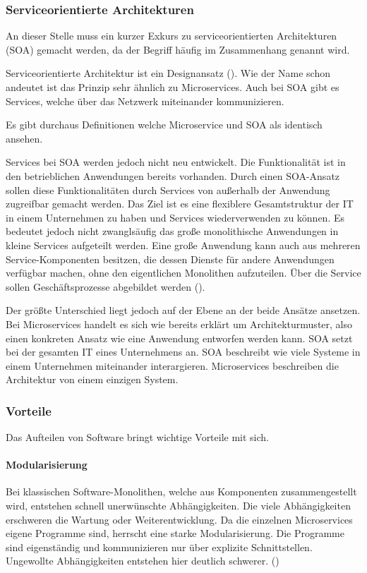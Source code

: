 \subsubsection{Serviceorientierte Architekturen}

An dieser Stelle muss ein kurzer Exkurs zu serviceorientierten Architekturen (SOA) gemacht werden, da der Begriff häufig im Zusammenhang genannt wird. 

Serviceorientierte Architektur ist ein Designansatz (\cite[S. 29]{newmanMicroservices2015}). Wie der Name schon andeutet ist das Prinzip sehr ähnlich zu Microservices. Auch bei SOA gibt es Services, welche über das Netzwerk miteinander kommunizieren.
  
Es gibt durchaus Definitionen welche Microservice und SOA als identisch ansehen. 

Services bei SOA werden jedoch nicht neu entwickelt. Die Funktionalität ist in den betrieblichen Anwendungen bereits vorhanden. Durch einen SOA-Ansatz sollen diese Funktionalitäten durch Services von außerhalb der Anwendung zugreifbar gemacht werden. Das Ziel ist es eine flexiblere Gesamtstruktur der IT in einem Unternehmen zu haben und Services wiederverwenden zu können. Es bedeutet jedoch nicht zwanglsäufig das große monolithische Anwendungen in kleine Services aufgeteilt werden. Eine große Anwendung kann auch aus mehreren Service-Komponenten besitzen, die dessen Dienste für andere Anwendungen verfügbar machen, ohne den eigentlichen Monolithen aufzuteilen. Über die Service sollen Geschäftsprozesse abgebildet werden (\cite[S. 2]{wolffMicroservices2018}).

Der größte Unterschied liegt jedoch auf der Ebene an der beide Ansätze ansetzen. Bei Microservices handelt es sich wie bereits erklärt um Architekturmuster, also einen konkreten Ansatz wie eine Anwendung entworfen werden kann. SOA setzt bei der gesamten IT eines Unternehmens an. SOA beschreibt wie viele Systeme in einem Unternehmen miteinander interargieren. Microservices beschreiben die Architektur von einem einzigen System. 


\subsubsection{Vorteile}

Das Aufteilen von Software bringt wichtige Vorteile mit sich.

\paragraph{Modularisierung}
Bei klassischen Software-Monolithen, welche aus Komponenten zusammengestellt wird, entstehen schnell unerwünschte Abhängigkeiten. Die viele Abhängigkeiten erschweren die Wartung oder Weiterentwicklung. Da die einzelnen Microservices eigene Programme sind, herrscht eine starke Modularisierung. Die Programme sind eigenständig und kommunizieren nur über explizite Schnittstellen. Ungewollte Abhängigkeiten entstehen hier deutlich schwerer. (\cite[S. 3]{wolffMicroservices2018})

